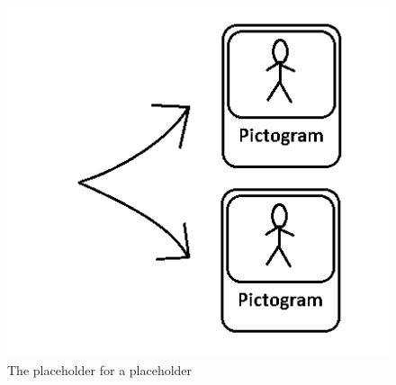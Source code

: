 \begin{figure} [h!]
\begin{minipage}{.3\textwidth}
\centering
\includegraphics[scale=0.5]{Pics/Sprint3/placeholders/PLACEHOLDER_VALG.png}
\caption{The placeholder for a placeholder}
\label{fig:placeChoice}
\end{minipage}
\end{figure}